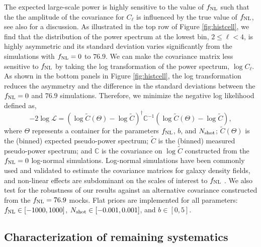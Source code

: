 The expected large-scale power is highly sensitive to the value of $f_{\rm NL}$ such that the the amplitude of the covariance for $C_{\ell}$ is influenced by the true value of $f_{\rm NL}$, see also \cite{2013MNRAS.428.1116R} for a discussion. As illustrated in the top row of Figure \ref{fig:histcell}, we find that the distribution of the power spectrum at the lowest bin, $2\leq \ell < 4$, is highly asymmetric and its standard deviation varies significantly from the simulations with $f_{\rm NL}=0$ to $76.9$. We can make the covariance matrix less sensitive to $f_{\rm NL}$ by taking the log transformation of the power spectrum, $\log C_{\ell}$. As shown in the bottom panels in Figure \ref{fig:histcell}, the log transformation reduces the asymmetry and the difference in the standard deviations between the $f_{\rm NL}=0$ and $76.9$ simulations. Therefore, we minimize the negative log likelihood defined as,
\begin{equation}\label{eq:likelihood}
-2\log \mathcal{L} = (\log \tilde{C}(\Theta)-\log \tilde{C})^{\dagger} \mathbb{C}^{-1} (\log \tilde{C}(\Theta)-\log \tilde{C}),
\end{equation}
where $\Theta$ represents a container for the parameters $f_{\rm NL}$, $b$, and $N_{\rm shot}$; $\tilde{C}(\Theta)$ is the (binned) expected pseudo-power spectrum; $\tilde{C}$ is the (binned) measured pseudo-power spectrum; and $\mathbb{C}$ is the covariance on $\log\tilde{C}$ constructed from the $f_{\rm NL}=0$ log-normal simulations. Log-normal simulations have been commonly used and validated to estimate the covariance matrices for galaxy density fields, and non-linear effects are subdominant on the scales of interest to $f_{\rm NL}$ \citep[see, e.g.,][]{2017MNRAS.466.1444C, 2021MNRAS.508.3125F}. We also test for the robustness of our results against an alternative covariance constructed from the $f_{\rm NL}=76.9$ mocks. Flat priors are implemented for all parameters: $f_{\rm NL} \in [-1000, 1000]$, $N_{\rm shot} \in [-0.001, 0.001]$, and $b \in [0, 5]$.


\subsection{Characterization of remaining systematics}
\label{ssec:characterization}

